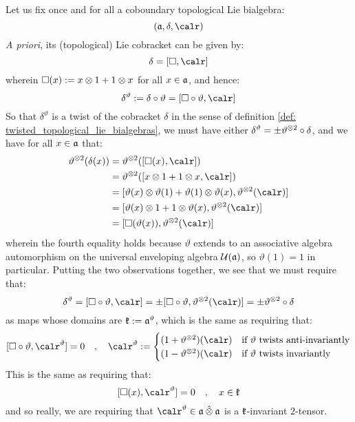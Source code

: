         Let us fix once and for all a coboundary topological Lie bialgebra:
            $$(\a, \delta, \calr)$$
        \textit{A priori}, its (topological) Lie cobracket can be given by:
            $$\delta = [ \Box, \calr ]$$
        wherein $\Box(x) := x \tensor 1 + 1 \tensor x$ for all $x \in \mathfrak{a}$, and hence:
            \begin{equation}
                \delta^{\vartheta} := \delta \circ \vartheta = [ \Box \circ \vartheta, \calr ]
            \end{equation}
        So that $\delta^{\vartheta}$ is a twist of the cobracket $\delta$ in the sense of definition \ref{def: twisted_topological_lie_bialgebras}, we must have either $\delta^{\vartheta} = \pm \vartheta^{\tensor 2} \circ \delta$, and we have for all $x \in \mathfrak{a}$ that:
            $$
                \begin{aligned}
                    \vartheta^{\tensor 2}(\delta(x)) & = \vartheta^{\tensor 2}([\Box(x), \calr])
                    \\
                    & = \vartheta^{\tensor 2}( [x \tensor 1 + 1 \tensor x, \calr] )
                    \\
                    & = [ \vartheta(x) \tensor \vartheta(1) + \vartheta(1) \tensor \vartheta(x), \vartheta^{\tensor 2}(\calr) ]
                    \\
                    & = [ \vartheta(x) \tensor 1 + 1 \tensor \vartheta(x), \vartheta^{\tensor 2}(\calr) ]
                    \\
                    & = [ \Box(\vartheta(x)), \vartheta^{\tensor 2}(\calr) ]
                \end{aligned}
            $$
        wherein the fourth equality holds because $\vartheta$ extends to an associative algebra automorphism on the universal enveloping algebra $\mathcal{U}(\mathfrak{a})$, so $\vartheta(1) = 1$ in particular. Putting the two observations together, we see that we must require that:
            \begin{equation}
                \delta^{\vartheta} = [\Box \circ \vartheta, \calr] = \pm [ \Box \circ \vartheta, \vartheta^{\tensor 2}(\calr) ] = \pm \vartheta^{\tensor 2} \circ \delta
            \end{equation}
        as maps whose domains are $\mathfrak{k} := \mathfrak{a}^{\vartheta}$, which is the same as requiring that:
            $$
            [\Box \circ \vartheta, \calr^{\vartheta}] = 0
            \quad, \quad
            \calr^{\vartheta} :=
                \begin{cases}
                    (1 + \vartheta^{\tensor 2})(\calr) & \text{if $\vartheta$ twists anti-invariantly}
                    \\
                    (1 - \vartheta^{\tensor 2})(\calr) & \text{if $\vartheta$ twists invariantly}
                \end{cases}
            $$
        This is the same as requiring that:
            $$[ \Box(x), \calr^{\vartheta} ] = 0 \quad, \quad x \in \k$$
        and so really, we are requiring that $\calr^{\vartheta} \in \a \hattensor \a$ is a $\mathfrak{k}$-invariant $2$-tensor.
        

